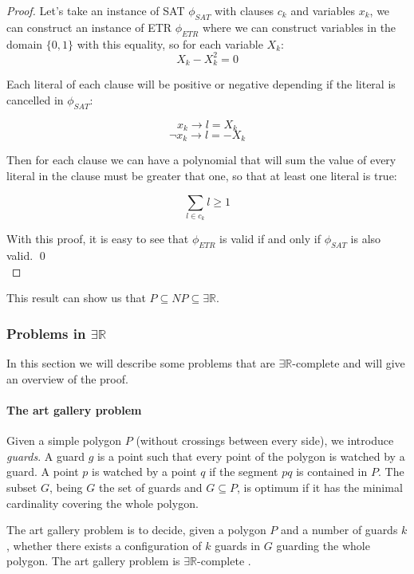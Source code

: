 \begin{proof}
  Let's take an instance of SAT $\phi_{SAT}$ with clauses $c_k$ and variables
  $x_k$, we can construct an instance of ETR $\phi_{ETR}$ where we can
  construct variables in the domain $\{0,1\}$ with this equality, so for each
  variable $X_k$:
  $$X_k - X_k^2 = 0$$

  Each literal of each clause will be positive or negative depending if the literal is cancelled in $\phi_{SAT}$:

  $$x_k \to l = X_k$$
  $$\neg x_k \to l = -X_k$$

  Then for each clause we can have a polynomial that will sum the value of every literal in the clause must be greater that one, so that at least one literal is true:

  $$\sum_{l\in c_k} l \geq 1$$

  With this proof, it is easy to see that $\phi_{ETR}$ is valid if and only if $\phi_{SAT}$ is also valid.  \qed\\

\end{proof}

This result can show us that $P \subseteq NP \subseteq \exists \mathbb{R}$.

\subsubsection{Problems in $\exists \mathbb{R}$}

In this section we will describe some problems that are $\exists
\mathbb{R}$-complete and will give an overview of the proof.

\paragraph{The art gallery problem} Given a simple polygon $P$ (without
crossings between every side), we introduce \textit{guards}. A guard
$g$ is a point such that every point of the polygon is watched by a guard.
A point $p$ is watched by a point $q$ if the segment $pq$ is contained
in $P$. The subset $G$, being $G$ the set of guards and $G \subseteq
P$, is optimum if it has the minimal cardinality covering the whole
polygon.

The art gallery problem is to decide, given a polygon $P$ and a number of
guards $k$, whether there exists a configuration of $k$ guards in $G$
guarding the whole polygon. The art gallery problem is $\exists
\mathbb{R}$-complete \cite{abrahamsenArtGalleryProblem2017}.

